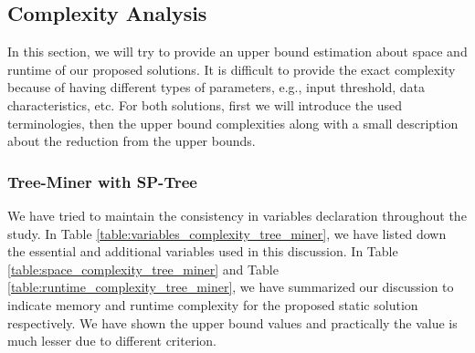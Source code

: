 
\subsection{Complexity Analysis}
In this section, we will try to provide an upper bound estimation about space and runtime of our proposed solutions. It is difficult to provide the exact complexity because of having different types of parameters, e.g., input threshold, data characteristics, etc. For both solutions, first we will introduce the used terminologies, then the upper bound complexities along with a small description about the reduction from the upper bounds. 

\subsubsection{Tree-Miner with SP-Tree}
We have tried to maintain the consistency in variables declaration throughout the study. In Table \ref{table:variables_complexity_tree_miner}, we have listed down the essential and additional variables used in this discussion. In Table \ref{table:space_complexity_tree_miner} and Table \ref{table:runtime_complexity_tree_miner}, we have summarized our discussion to indicate memory and runtime complexity for the proposed static solution respectively. We have shown the upper bound values and practically the value is much lesser due to different criterion. 


